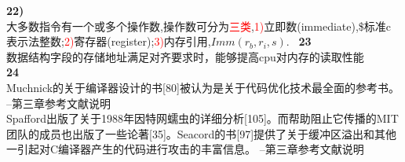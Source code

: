 \documentclass{article}
\newcommand{\red}[1]{\textcolor{red}{#1}}
\begin{document}
\begin{CJK}{UTF8}{uyhei}
\textbf{22)}	\\
大多数指令有一个或多个操作数,操作数可分为\red{三类},\red{1)}立即数(immediate),\$标准c表示法整数;\red{2)}寄存器(register);\red{3)}内存引用,$Imm(r_b, r_i, s)$.	\
\textbf{23}	\\
数据结构字段的存储地址满足对齐要求时，能够提高cpu对内存的读取性能	\\
\textbf{24}	\\
Muchnick的关于编译器设计的书[80]被认为是关于代码优化技术最全面的参考书。	--第三章参考文献说明	\\
Spafford出版了关于1988年因特网蠕虫的详细分析[105]。而帮助阻止它传播的MIT团队的成员也出版了一些论著[35]。Seacord的书[97]提供了关于缓冲区溢出和其他一引起对C编译器产生的代码进行攻击的丰富信息。		--第三章参考文献说明	\\

\end{CJK}
\end{document}
